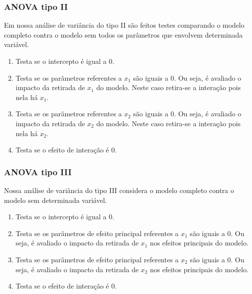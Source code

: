 \documentclass[10pt,
  aspectratio=169,
  serif,
  mathserif,
  professionalfont,
  compress,
  handout,
  ]{beamer}\usepackage[]{graphicx}\usepackage[]{color}
\begin{document}

\begin{frame}

\frametitle{ANOVA tipo II}

Em nossa análise de variância do tipo II são feitos testes comparando o modelo completo contra o modelo sem todos os parâmetros que envolvem determinada variável.

\begin{enumerate}
 \itemsep 2ex
  \item Testa se o intercepto é igual a 0.
  
  \item Testa se os parâmetros referentes a $x_1$ são iguais a 0. Ou seja, é avaliado o impacto da retirada de $x_1$ do modelo. Neste caso retira-se a interação pois nela há $x_1$.
  
  \item Testa se os parâmetros referentes a $x_2$ são iguais a 0. Ou seja, é avaliado o impacto da retirada de $x_2$ do modelo. Neste caso retira-se a interação pois nela há $x_2$.
  
  \item Testa se o efeito de interação é 0.

\end{enumerate}

\end{frame}


\begin{frame}

\frametitle{ANOVA tipo III}

Nossa análise de variância do tipo III considera o modelo completo contra o modelo sem determinada variável.

\begin{enumerate}
 \itemsep 2ex
  \item Testa se o intercepto é igual a 0.
  
  \item Testa se os parâmetros de efeito principal referentes a $x_1$ são iguais a 0. Ou seja, é avaliado o impacto da retirada de $x_1$ nos efeitos principais do modelo.
  
  \item Testa se os parâmetros de efeito principal referentes a $x_2$ são iguais a 0. Ou seja, é avaliado o impacto da retirada de $x_2$ nos efeitos principais do modelo.
  
  \item Testa se o efeito de interação é 0.
\end{enumerate}

\end{frame}
\end{document}
